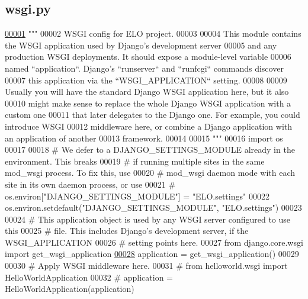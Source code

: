 \hypertarget{wsgi_8py_source}{}\subsection{wsgi.\+py}
\label{wsgi_8py_source}

\begin{DoxyCode}
\hypertarget{wsgi_8py_source_l00001}{}\hyperlink{namespaceELO_1_1wsgi}{00001} \textcolor{stringliteral}{"""}
00002 \textcolor{stringliteral}{WSGI config for ELO project.}
00003 \textcolor{stringliteral}{}
00004 \textcolor{stringliteral}{This module contains the WSGI application used by Django's development server}
00005 \textcolor{stringliteral}{and any production WSGI deployments. It should expose a module-level variable}
00006 \textcolor{stringliteral}{named ``application``. Django's ``runserver`` and ``runfcgi`` commands discover}
00007 \textcolor{stringliteral}{this application via the ``WSGI\_APPLICATION`` setting.}
00008 \textcolor{stringliteral}{}
00009 \textcolor{stringliteral}{Usually you will have the standard Django WSGI application here, but it also}
00010 \textcolor{stringliteral}{might make sense to replace the whole Django WSGI application with a custom one}
00011 \textcolor{stringliteral}{that later delegates to the Django one. For example, you could introduce WSGI}
00012 \textcolor{stringliteral}{middleware here, or combine a Django application with an application of another}
00013 \textcolor{stringliteral}{framework.}
00014 \textcolor{stringliteral}{}
00015 \textcolor{stringliteral}{"""}
00016 \textcolor{keyword}{import} os
00017 
00018 \textcolor{comment}{# We defer to a DJANGO\_SETTINGS\_MODULE already in the environment. This breaks}
00019 \textcolor{comment}{# if running multiple sites in the same mod\_wsgi process. To fix this, use}
00020 \textcolor{comment}{# mod\_wsgi daemon mode with each site in its own daemon process, or use}
00021 \textcolor{comment}{# os.environ["DJANGO\_SETTINGS\_MODULE"] = "ELO.settings"}
00022 os.environ.setdefault(\textcolor{stringliteral}{"DJANGO\_SETTINGS\_MODULE"}, \textcolor{stringliteral}{"ELO.settings"})
00023 
00024 \textcolor{comment}{# This application object is used by any WSGI server configured to use this}
00025 \textcolor{comment}{# file. This includes Django's development server, if the WSGI\_APPLICATION}
00026 \textcolor{comment}{# setting points here.}
00027 \textcolor{keyword}{from} django.core.wsgi \textcolor{keyword}{import} get\_wsgi\_application
\hypertarget{wsgi_8py_source_l00028}{}\hyperlink{namespaceELO_1_1wsgi_a8951c4ea2920440aeeb73c65ab517a5d}{00028} application = get\_wsgi\_application()
00029 
00030 \textcolor{comment}{# Apply WSGI middleware here.}
00031 \textcolor{comment}{# from helloworld.wsgi import HelloWorldApplication}
00032 \textcolor{comment}{# application = HelloWorldApplication(application)}
\end{DoxyCode}
